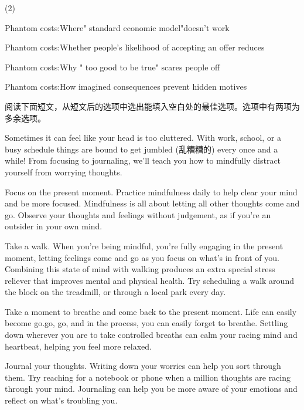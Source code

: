 \documentclass{英语试卷}
\begin{document}
\begin{choices}(2)
  \item Phantom costs:Where" standard economic model"doesn't work
  \item Phantom costs:Whether people's likelihood of accepting an offer reduces
  \item Phantom costs:Why " too good to be true" scares people off
  \item Phantom costs:How imagined consequences prevent hidden motives
\end{choices}
\par 阅读下面短文，从短文后的选项中选出能填入空白处的最佳选项。选项中有两项为多余选项。\par
\par Sometimes it can feel like your head is too cluttered. With work, school, or a busy schedule things are bound to get jumbled (乱糟糟的) every once and a while!  From focusing to journaling, we'll teach you how to mindfully distract yourself from worrying thoughts.\par
\par Focus on the present moment. Practice mindfulness daily to help clear your mind and be more focused. Mindfulness is all about letting all other thoughts come and go. Observe your thoughts and feelings without judgement, as if you're an outsider in your own mind. \par
\par Take a walk.  When you're being mindful, you're fully engaging in the present moment, letting feelings come and go as you focus on what's in front of you. Combining this state of mind with walking produces an extra special stress reliever that improves mental and physical health. Try scheduling a walk around the block on the treadmill, or through a local park every day.\par
\par {} Take a moment to breathe and come back to the present moment. Life can easily become go.go, go, and in the process, you can easily forget to breathe. Settling down wherever you are to take controlled breaths can calm your racing mind and heartbeat, helping you feel more relaxed.\par
\par Journal your thoughts. Writing down your worries can help you sort through them. Try reaching for a notebook or phone when a million thoughts are racing through your mind.  Journaling can help you be more aware of your emotions and reflect on what's troubling you.\par
\end{document}
